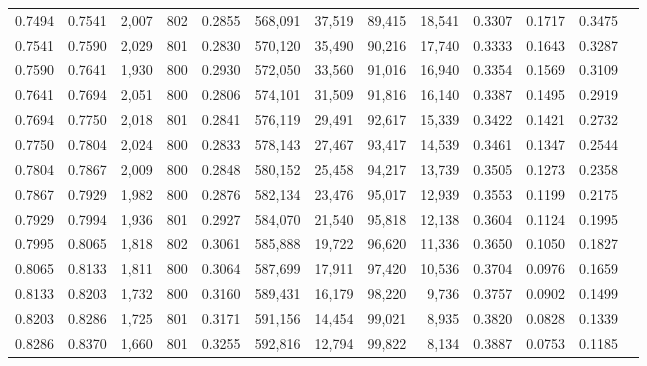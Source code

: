 \begin{tabular}{rrrrrrrrrrrrr}
0.7494 & 0.7541 &  2,007 & 802 &                                     0.2855 & 568,091 &  37,519 &  89,415 &  18,541 & 0.3307 & 0.1717 & 0.3475 \\
0.7541 & 0.7590 &  2,029 & 801 &                                     0.2830 & 570,120 &  35,490 &  90,216 &  17,740 & 0.3333 & 0.1643 & 0.3287 \\
0.7590 & 0.7641 &  1,930 & 800 &                                     0.2930 & 572,050 &  33,560 &  91,016 &  16,940 & 0.3354 & 0.1569 & 0.3109 \\
0.7641 & 0.7694 &  2,051 & 800 &                                     0.2806 & 574,101 &  31,509 &  91,816 &  16,140 & 0.3387 & 0.1495 & 0.2919 \\
0.7694 & 0.7750 &  2,018 & 801 &                                     0.2841 & 576,119 &  29,491 &  92,617 &  15,339 & 0.3422 & 0.1421 & 0.2732 \\
0.7750 & 0.7804 &  2,024 & 800 &                                     0.2833 & 578,143 &  27,467 &  93,417 &  14,539 & 0.3461 & 0.1347 & 0.2544 \\
0.7804 & 0.7867 &  2,009 & 800 &                                     0.2848 & 580,152 &  25,458 &  94,217 &  13,739 & 0.3505 & 0.1273 & 0.2358 \\
0.7867 & 0.7929 &  1,982 & 800 &                                     0.2876 & 582,134 &  23,476 &  95,017 &  12,939 & 0.3553 & 0.1199 & 0.2175 \\
0.7929 & 0.7994 &  1,936 & 801 &                                     0.2927 & 584,070 &  21,540 &  95,818 &  12,138 & 0.3604 & 0.1124 & 0.1995 \\
0.7995 & 0.8065 &  1,818 & 802 &                                     0.3061 & 585,888 &  19,722 &  96,620 &  11,336 & 0.3650 & 0.1050 & 0.1827 \\
0.8065 & 0.8133 &  1,811 & 800 &                                     0.3064 & 587,699 &  17,911 &  97,420 &  10,536 & 0.3704 & 0.0976 & 0.1659 \\
0.8133 & 0.8203 &  1,732 & 800 &                                     0.3160 & 589,431 &  16,179 &  98,220 &   9,736 & 0.3757 & 0.0902 & 0.1499 \\
0.8203 & 0.8286 &  1,725 & 801 &                                     0.3171 & 591,156 &  14,454 &  99,021 &   8,935 & 0.3820 & 0.0828 & 0.1339 \\
0.8286 & 0.8370 &  1,660 & 801 &                                     0.3255 & 592,816 &  12,794 &  99,822 &   8,134 & 0.3887 & 0.0753 & 0.1185 \\

\end{tabular}
